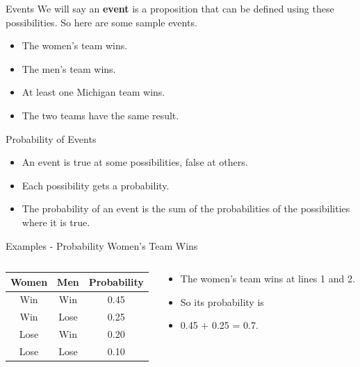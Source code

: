 \documentclass[
  ignorenonframetext,
]{beamer}
\providecommand{\tightlist}{%
  \setlength{\itemsep}{0pt}\setlength{\parskip}{0pt}}
\begin{document}
\begin{frame}{Events}
\protect\hypertarget{events}{}
We will say an \textbf{event} is a proposition that can be defined using
these possibilities. So here are some sample events.

\begin{itemize}
\tightlist
\item
  The women's team wins.
\item
  The men's team wins.
\item
  At least one Michigan team wins.
\item
  The two teams have the same result.
\end{itemize}
\end{frame}

\begin{frame}{Probability of Events}
\protect\hypertarget{probability-of-events}{}
\begin{itemize}
\tightlist
\item
  An event is true at some possibilities, false at others.
\item
  Each possibility gets a probability.
\item
  The probability of an event is the sum of the probabilities of the
  possibilities where it is true.
\end{itemize}
\end{frame}

\begin{frame}{Examples - Probability Women's Team Wins}
\protect\hypertarget{examples---probability-womens-team-wins}{}
\begin{columns}[T]
\begin{column}{0.48\textwidth}
\begin{longtable}[]{@{}ccc@{}}
\toprule
Women & Men & Probability \\
\midrule
\endhead
Win & Win & 0.45 \\
Win & Lose & 0.25 \\
Lose & Win & 0.20 \\
Lose & Lose & 0.10 \\
\bottomrule
\end{longtable}
\end{column}

\begin{column}{0.48\textwidth}
\bigskip

\begin{itemize}
\tightlist
\item
  The women's team wins at lines 1 and 2.
\item
  So its probability is
\item
  0.45 + 0.25 = 0.7.
\end{itemize}
\end{column}
\end{columns}
\end{frame}
\end{document}
